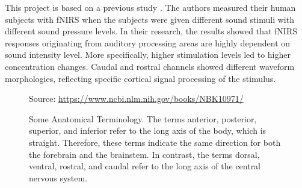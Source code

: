 This project is based on a previous study \cite{Weder2018}. The authors measured their human subjects with fNIRS when the subjects were given different sound stimuli with different sound pressure levels. In their research, the results showed that fNIRS responses originating from auditory processing areas are highly dependent on sound intensity level. More specifically, higher stimulation levels led to higher concentration changes. Caudal and rostral channels showed different waveform morphologies, reflecting specific cortical signal processing of the stimulus. 

\begin{figure}[h]
  \centering
           {Source: \url{https://www.ncbi.nlm.nih.gov/books/NBK10971/}}
   
  \caption{Some Anatomical Terminology. The terms anterior, posterior, superior, and inferior refer to the long axis of the body, which is straight. Therefore, these terms indicate the same direction for both the forebrain and the brainstem. In contrast, the terms dorsal, ventral, rostral, and caudal refer to the long axis of the central nervous system.}
\end{figure}



